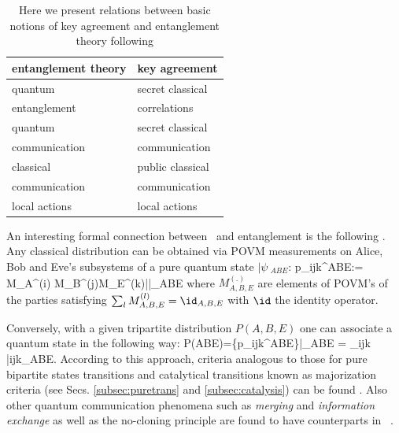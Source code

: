 \documentclass[twocolumn,aps,rmp]{revtex4}
\begin{document}
\begin{table}
    \centering
    \begin{tabular}{l @{\hskip2mm} | @{\hskip2mm} l}
      \bf entanglement theory & \bf key agreement \\[2mm]
      \hline
      quantum &secret classical \\
      entanglement & correlations\\[2mm]
      quantum & secret classical \\
      communication & communication\\[2mm]
      classical & public classical \\
      communication & communication\\[2mm]
      local actions & local actions\\
        \end{tabular}
        \caption{Here we present relations between basic notions
        of key agreement and entanglement theory following \cite{Collins-Popescu}}
\end{table}

An interesting formal connection between \cka\ and entanglement is
the following \cite{GisinWolf_linking}.
Any classical distribution can be obtained via POVM
measurements on Alice, Bob and Eve's subsystems of a pure quantum
state $|\psi\>_{ABE}$: \be p_{ijk}^{ABE}:={\tr} M_A^{(i)}\ot
M_B^{(j)}\ot M_E^{(k)}|\psi\>\<\psi|_{ABE}
\label{eq:GWprocedure}\ee where
$M_{A,B,E}^{(.)}$ are elements of POVM's of the parties satisfying
$\sum_{l}M_{A,B,E}^{(l)}=\id_{A,B,E}$ with $\id$ the identity operator.

Conversely, with a given tripartite distribution $P(A,B,E)$ one can
associate a quantum state in the following way: \be
P(ABE)=\{{p_{ijk}^{ABE}}\}\longmapsto |\psi_{ABE}\> = \sum_{ijk}
|ijk\>_{ABE}. \ee According to this approach,
criteria analogous to those for pure bipartite states transitions
and catalytical transitions known as majorization criteria (see Secs. \ref{subsec:puretrans} and \ref{subsec:catalysis}) can
be found \cite{GisinWolf_linking,Collins-Popescu}. Also
other quantum communication phenomena such as {\it merging}
\cite{SW-nature} and {\it information exchange} \cite{uncom_info} as
well as the no-cloning principle are found to have counterparts in
\cka\ \cite{OppenSpekWint05}.
\end{document}

